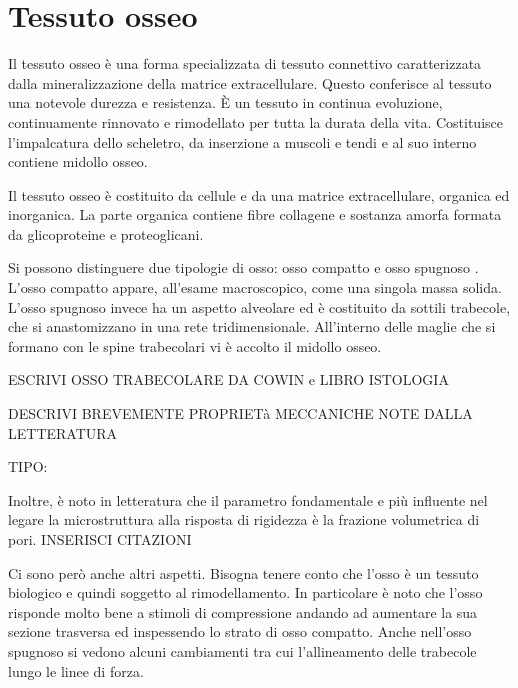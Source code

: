 \documentclass[a4paper,num-refs]{oup-contemporary}
\begin{document}
\section{Tessuto osseo}

Il tessuto osseo è una forma specializzata di tessuto connettivo caratterizzata dalla mineralizzazione della matrice extracellulare. Questo conferisce al tessuto una notevole durezza e resistenza. È un tessuto in continua evoluzione, continuamente rinnovato e rimodellato per tutta la durata della vita. Costituisce l'impalcatura dello scheletro, da inserzione a muscoli e tendi e al suo interno contiene midollo osseo. 

Il tessuto osseo è costituito da cellule e da una matrice extracellulare, organica ed inorganica. La parte organica contiene fibre collagene e sostanza amorfa formata da glicoproteine e proteoglicani. 

Si possono distinguere due tipologie di osso: osso compatto e osso spugnoso \citep{Monesi}. 
L'osso compatto appare, all'esame macroscopico, come una singola massa solida. L'osso spugnoso invece ha un aspetto alveolare ed è costituito da sottili trabecole, che si anastomizzano in una rete tridimensionale. All'interno delle maglie che si formano con le spine trabecolari vi è accolto il midollo osseo.






ESCRIVI OSSO TRABECOLARE DA COWIN e LIBRO ISTOLOGIA

DESCRIVI BREVEMENTE PROPRIETà MECCANICHE NOTE DALLA LETTERATURA

TIPO:

Inoltre, è noto in letteratura che il parametro fondamentale e più influente nel legare la microstruttura alla risposta di rigidezza è la frazione volumetrica di pori. INSERISCI CITAZIONI

Ci sono però anche altri aspetti. Bisogna tenere conto che l'osso è un tessuto biologico e quindi soggetto al rimodellamento. In particolare è noto che l'osso risponde molto bene a stimoli di compressione andando ad aumentare la sua sezione trasversa ed inspessendo lo strato di osso compatto. Anche nell'osso spugnoso si vedono alcuni cambiamenti tra cui l'allineamento delle trabecole lungo le linee di forza.  \citep{Ferguson:2003}
\end{document}
